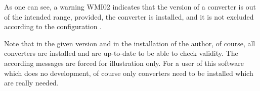 As one can see, a warning WMI02 indicates 
that the version of a converter is out of the intended range, 
provided, the converter is installed, and it is not excluded 
according to the configuration .

Note that in the given version and in the installation of the author,
of course, all converters are installed and are up-to-date
to be able to check validity.
The according messages are forced for illustration only. 
For a user of this software which does no development, 
of course only converters need to be installed which are really needed. 


